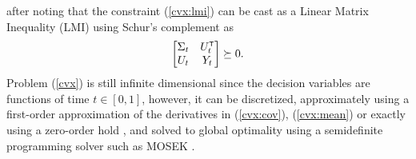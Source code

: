 \documentclass[twoside]{article}
\renewcommand{\eqref}[1]{(\ref{#1})}
\renewcommand{\t}{^{\mbox{\tiny\sf T}}} %
\begin{document}
after noting that the constraint \eqref{cvx:lmi} can be cast as a Linear Matrix Inequality (LMI) using Schur's complement as 
\begin{equation*}
\begin{bmatrix} 
\Sigma_t & U_t\t \\
U_t & Y_t
\end{bmatrix} \succeq 0.
\end{equation*} 
Problem \eqref{cvx} is still infinite dimensional since the decision variables are functions of time $t \in [0, 1]$, however, it can be discretized, approximately using a first-order approximation of the derivatives in \eqref{cvx:cov}, \eqref{cvx:mean} \citep{chen2015optimal2} or exactly using a zero-order hold \citep{liu2022optimal, rapakoulias2023discrete}, and solved to global optimality using a semidefinite programming solver such as MOSEK \citep{aps2020mosek}.
\end{document}
